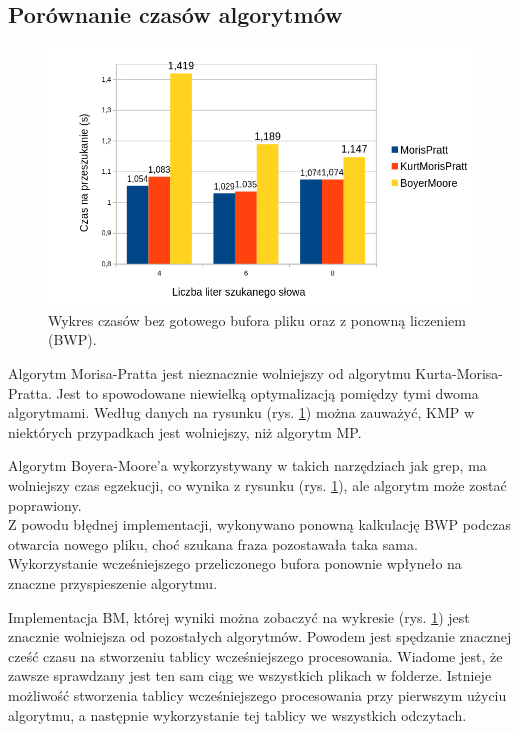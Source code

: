 \subsection{Porównanie czasów algorytmów}
\label{rozdzial:porównanieBenchmarkowAlgos}

\begin{figure}[htbp]
    \centering
    \includegraphics[width=\textwidth]{./images/GraphFirstAttempt.png}
    \caption{Wykres czasów bez gotowego bufora pliku oraz z ponowną 
    liczeniem (BWP).}
    \label{fig:GraphFirstAttempt}
\end{figure}

Algorytm Morisa-Pratta jest nieznacznie wolniejszy od algorytmu 
Kurta-Morisa-Pratta. Jest to spowodowane niewielką optymalizacją pomiędzy tymi 
dwoma algorytmami. Według danych na rysunku (rys. \ref{fig:GraphFirstAttempt}) można 
zauważyć, KMP w niektórych przypadkach jest wolniejszy, niż algorytm MP.

Algorytm Boyera-Moore'a wykorzystywany w takich narzędziach jak grep, ma 
wolniejszy czas egzekucji, co wynika z rysunku (rys. \ref{fig:GraphFirstAttempt}), ale 
algorytm może zostać poprawiony. \\ Z powodu błędnej implementacji, wykonywano
ponowną kalkulację BWP podczas otwarcia nowego pliku, choć szukana fraza pozostawała
taka sama. Wykorzystanie wcześniejszego przeliczonego bufora ponownie wpłyneło na znaczne
przyspieszenie algorytmu.

Implementacja BM, której wyniki można zobaczyć na wykresie (rys. \ref{fig:GraphFirstAttempt}) jest
znacznie wolniejsza od pozostałych algorytmów. Powodem jest spędzanie znacznej
cześć czasu na stworzeniu tablicy wcześniejszego procesowania. Wiadome jest, że zawsze 
sprawdzany jest ten sam ciąg we wszystkich plikach w folderze. Istnieje możliwość 
stworzenia tablicy wcześniejszego procesowania przy pierwszym użyciu algorytmu, a następnie
wykorzystanie tej tablicy we wszystkich odczytach.


